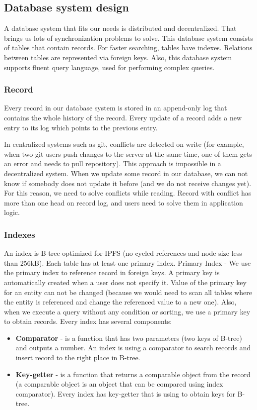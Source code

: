 \subsection{Database system design}
A database system that fits our needs is distributed and decentralized. That brings us lots of synchronization problems to solve. This database system consists of tables that contain records. For faster searching, tables have indexes. Relations between tables are represented via foreign keys. Also, this database system supports fluent query language, used for performing complex queries.

\subsubsection{Record} 
Every record in our database system is stored in an append-only log that contains the whole history of the record. Every update of a record adds a new entry to its log which points to the previous entry. 

In centralized systems such as git, conflicts are detected on write (for example, when two git users push changes to the server at the same time, one of them gets an error and needs to pull repository). This approach is impossible in a decentralized system. When we update some record in our database, we can not know if somebody does not update it before (and we do not receive changes yet). For this reason, we need to solve conflicts while reading. Record with conflict has more than one head on record log, and users need to solve them in application logic.


\subsubsection{Indexes}
An index is B-tree optimized for IPFS (no cycled references and node size less than 256kB). Each table has at least one primary index. Primary Index - We use the primary index to reference record in foreign keys. A primary key is automatically created when a user does not specify it. Value of the primary key for an entity can not be changed (because we would need to scan all tables where the entity is referenced and change the referenced value to a new one). Also, when we execute a query without any condition or sorting, we use a primary key to obtain records. Every index has several components: 
\begin{itemize}
    \item \textbf{Comparator} - is a function that has two parameters (two keys of B-tree) and outputs a number. An index is using a comparator to search records and insert record to the right place in B-tree.
    \item \textbf{Key-getter} - is a function that returns a comparable object from the record (a comparable object is an object that can be compared using index comparator). Every index has key-getter that is using to obtain keys for B-tree.
\end{itemize}

